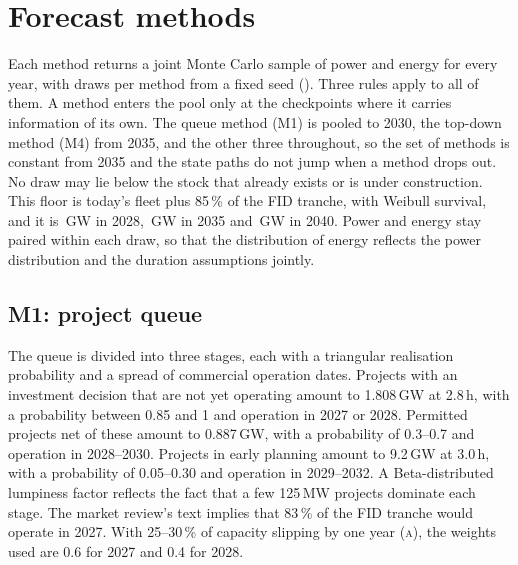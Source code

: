 \documentclass[11pt]{article}
\newcommand{\cls}[1]{\textsc{#1}}
\begin{document}
\section{Forecast methods}\label{sec:methods}

Each method returns a joint Monte Carlo sample of power and energy for every year, with  draws per method from a fixed seed ().
Three rules apply to all of them.
A method enters the pool only at the checkpoints where it carries information of its own. The queue method (M1) is pooled to 2030, the top-down method (M4) from 2035, and the other three throughout, so the set of methods is constant from 2035 and the state paths do not jump when a method drops out.
No draw may lie below the stock that already exists or is under construction. This floor is today's fleet plus 85\,\% of the FID tranche, with Weibull survival, and it is \,GW in 2028, \,GW in 2035 and \,GW in 2040.
Power and energy stay paired within each draw, so that the distribution of energy reflects the power distribution and the duration assumptions jointly.

\subsection{M1: project queue}
The queue is divided into three stages, each with a triangular realisation probability and a spread of commercial operation dates. Projects with an investment decision that are not yet operating amount to 1.808\,GW at 2.8\,h, with a probability between 0.85 and 1 and operation in 2027 or 2028. Permitted projects net of these amount to 0.887\,GW, with a probability of 0.3--0.7 and operation in 2028--2030. Projects in early planning amount to 9.2\,GW at 3.0\,h, with a probability of 0.05--0.30 and operation in 2029--2032.
A Beta-distributed lumpiness factor reflects the fact that a few 125\,MW projects dominate each stage.
The market review's text implies that 83\,\% of the FID tranche would operate in 2027. With 25--30\,\% of capacity slipping by one year (\cls{a}), the weights used are 0.6 for 2027 and 0.4 for 2028.
\end{document}

